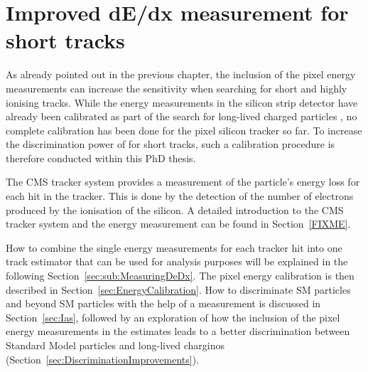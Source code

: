 \FloatBarrier
\chapter{Improved dE/dx measurement for short tracks}
\label{sec:DeDxMeasurement}
As already pointed out in the previous chapter, the inclusion of the pixel energy measurements can increase the sensitivity when searching for short and highly ionising tracks.
While the energy measurements in the silicon strip detector have already been calibrated as part of the search for long-lived charged particles \cite{bib:CMS:HSCP_8TeV}, no complete calibration has been done for the pixel silicon tracker so far.
To increase the discrimination power of \dedx for short tracks, such a calibration procedure is therefore conducted within this PhD thesis.

The CMS tracker system provides a measurement of the particle's energy loss for each hit in the tracker.
This is done by the detection of the number of electrons produced by the ionisation of the silicon.
A detailed introduction to the CMS tracker system and the energy measurement can be found in Section~\ref{FIXME}.

How to combine the single energy measurements for each tracker hit into one track \dedx estimator that can be used for analysis purposes will be explained in the following Section~\ref{sec:sub:MeasuringDeDx}.
The pixel energy calibration is then described in Section~\ref{sec:EnergyCalibration}. 
How to discriminate SM particles and beyond SM particles with the help of a \dedx measurement is discussed in Section~\ref{sec:Ias}, followed by an exploration of how the inclusion of the pixel energy measurements in the \dedx estimates leads to a better discrimination between Standard Model particles and long-lived charginos (Section~\ref{sec:DiscriminationImprovements}).


